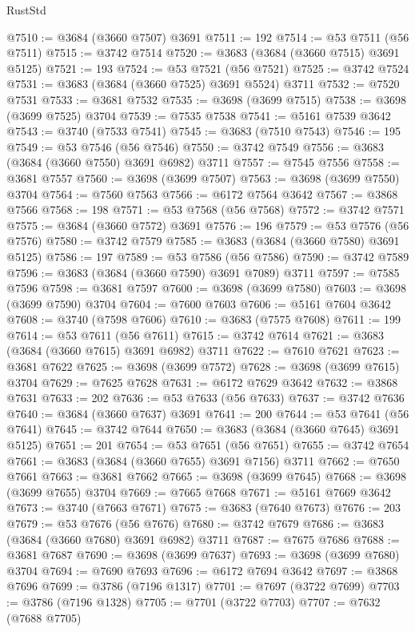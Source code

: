 \begin{lexlean}{RustStd}
\begin{coremodule}
{\begin{coremodule}
{{{{{{{{{{{{{{{{{{{{{{{{{{{{{{{{{{{{{{{{{{{{{{{@7510 := @3684 (@3660 @7507) @3691
@7511 := 192
@7514 := @53 @7511 (@56 @7511)
@7515 := @3742 @7514
@7520 := @3683 (@3684 (@3660 @7515) @3691 @5125)
@7521 := 193
@7524 := @53 @7521 (@56 @7521)
@7525 := @3742 @7524
@7531 := @3683 (@3684 (@3660 @7525) @3691 @5524) @3711
@7532 := @7520 @7531
@7533 := @3681 @7532
@7535 := @3698 (@3699 @7515)
@7538 := @3698 (@3699 @7525) @3704
@7539 := @7535 @7538
@7541 := @5161 @7539 @3642
@7543 := @3740 (@7533 @7541)
@7545 := @3683 (@7510 @7543)
@7546 := 195
@7549 := @53 @7546 (@56 @7546)
@7550 := @3742 @7549
@7556 := @3683 (@3684 (@3660 @7550) @3691 @6982) @3711
@7557 := @7545 @7556
@7558 := @3681 @7557
@7560 := @3698 (@3699 @7507)
@7563 := @3698 (@3699 @7550) @3704
@7564 := @7560 @7563
@7566 := @6172 @7564 @3642
@7567 := @3868 @7566
@7568 := 198
@7571 := @53 @7568 (@56 @7568)
@7572 := @3742 @7571
@7575 := @3684 (@3660 @7572) @3691
@7576 := 196
@7579 := @53 @7576 (@56 @7576)
@7580 := @3742 @7579
@7585 := @3683 (@3684 (@3660 @7580) @3691 @5125)
@7586 := 197
@7589 := @53 @7586 (@56 @7586)
@7590 := @3742 @7589
@7596 := @3683 (@3684 (@3660 @7590) @3691 @7089) @3711
@7597 := @7585 @7596
@7598 := @3681 @7597
@7600 := @3698 (@3699 @7580)
@7603 := @3698 (@3699 @7590) @3704
@7604 := @7600 @7603
@7606 := @5161 @7604 @3642
@7608 := @3740 (@7598 @7606)
@7610 := @3683 (@7575 @7608)
@7611 := 199
@7614 := @53 @7611 (@56 @7611)
@7615 := @3742 @7614
@7621 := @3683 (@3684 (@3660 @7615) @3691 @6982) @3711
@7622 := @7610 @7621
@7623 := @3681 @7622
@7625 := @3698 (@3699 @7572)
@7628 := @3698 (@3699 @7615) @3704
@7629 := @7625 @7628
@7631 := @6172 @7629 @3642
@7632 := @3868 @7631
@7633 := 202
@7636 := @53 @7633 (@56 @7633)
@7637 := @3742 @7636
@7640 := @3684 (@3660 @7637) @3691
@7641 := 200
@7644 := @53 @7641 (@56 @7641)
@7645 := @3742 @7644
@7650 := @3683 (@3684 (@3660 @7645) @3691 @5125)
@7651 := 201
@7654 := @53 @7651 (@56 @7651)
@7655 := @3742 @7654
@7661 := @3683 (@3684 (@3660 @7655) @3691 @7156) @3711
@7662 := @7650 @7661
@7663 := @3681 @7662
@7665 := @3698 (@3699 @7645)
@7668 := @3698 (@3699 @7655) @3704
@7669 := @7665 @7668
@7671 := @5161 @7669 @3642
@7673 := @3740 (@7663 @7671)
@7675 := @3683 (@7640 @7673)
@7676 := 203
@7679 := @53 @7676 (@56 @7676)
@7680 := @3742 @7679
@7686 := @3683 (@3684 (@3660 @7680) @3691 @6982) @3711
@7687 := @7675 @7686
@7688 := @3681 @7687
@7690 := @3698 (@3699 @7637)
@7693 := @3698 (@3699 @7680) @3704
@7694 := @7690 @7693
@7696 := @6172 @7694 @3642
@7697 := @3868 @7696
@7699 := @3786 (@7196 @1317)
@7701 := @7697 (@3722 @7699)
@7703 := @3786 (@7196 @1328)
@7705 := @7701 (@3722 @7703)
@7707 := @7632 (@7688 @7705)
}}}}}}}}}}}}}}}}}}}}}}}}}}}}}}}}}}}}}}}}}}}}}}}
\end{coremodule}}
\end{coremodule}
\end{lexlean}
